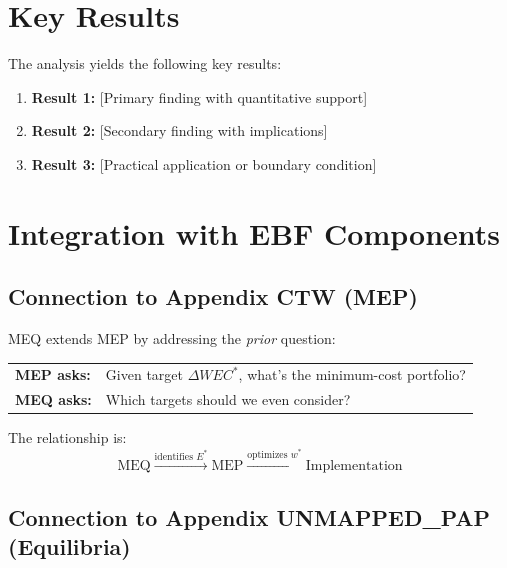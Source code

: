\section{Key Results}
\label{sec:meq-results}

The analysis yields the following key results:

\begin{enumerate}
    \item \textbf{Result 1:} [Primary finding with quantitative support]
    \item \textbf{Result 2:} [Secondary finding with implications]
    \item \textbf{Result 3:} [Practical application or boundary condition]
\end{enumerate}


\section{Integration with EBF Components}
\label{sec:meq-integration}

\subsection{Connection to Appendix CTW (MEP)}

MEQ extends MEP by addressing the \textit{prior} question:

\begin{center}
\begin{tabular}{ll}
\textbf{MEP asks:} & Given target $\Delta WEC^*$, what's the minimum-cost portfolio? \\
\textbf{MEQ asks:} & Which targets should we even consider?
\end{tabular}
\end{center}

The relationship is:
\begin{equation}
\text{MEQ} \xrightarrow{\text{identifies } E^*} \text{MEP} \xrightarrow{\text{optimizes } w^*} \text{Implementation}
\end{equation}

\subsection{Connection to Appendix UNMAPPED_PAP (Equilibria)}

